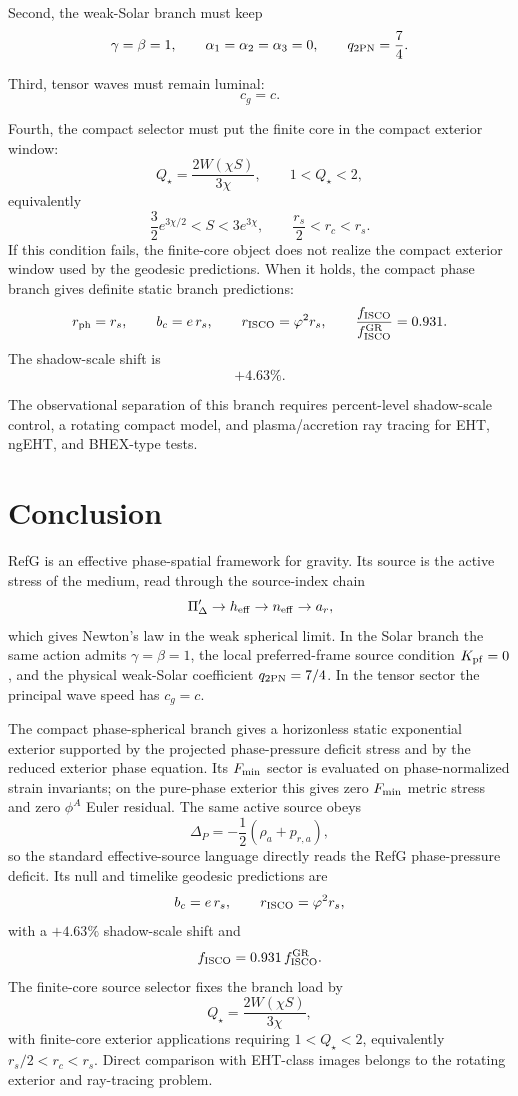\documentclass[12pt,a4paper]{article}
\begin{document}
Second, the weak-Solar branch must keep
\[
\gamma=\beta=1,\qquad
\alpha_1=\alpha_2=\alpha_3=0,
\qquad
q_{2{\rm PN}}=\frac74.
\]

Third, tensor waves must remain luminal:
\[
c_g=c.
\]

Fourth, the compact selector must put the finite core in the compact exterior
window:
\[
Q_\star=\frac{2W(\chi S)}{3\chi},\qquad
1<Q_\star<2,
\]
equivalently
\[
\frac32 e^{3\chi/2}<S<3e^{3\chi},\qquad
\frac{r_s}{2}<r_c<r_s.
\]
If this condition fails, the finite-core object does not realize the compact
exterior window used by the geodesic predictions. When it holds, the compact
phase branch gives definite static branch predictions:
\[
r_{\rm ph}=r_s,\qquad
b_c=e\,r_s,\qquad
r_{\rm ISCO}=\varphi^2r_s,\qquad
\frac{f_{\rm ISCO}}{f_{\rm ISCO}^{\rm GR}}=0.931.
\]
The shadow-scale shift is
\[
+4.63\%.
\]

The observational separation of this branch requires percent-level shadow-scale control, a rotating compact model, and plasma/accretion ray tracing for EHT, ngEHT, and BHEX-type tests.

\section{Conclusion}

RefG is an effective phase-spatial framework for gravity. Its source is the active stress of the medium, read through the source-index chain
\[
\Pi_\Delta'\rightarrow h_{\rm eff}\rightarrow n_{\rm eff}\rightarrow a_r,
\]
which gives Newton's law in the weak spherical limit. In the Solar branch the same action admits $\gamma=\beta=1$, the local preferred-frame source condition $K_{\rm pf}=0$, and the physical weak-Solar coefficient $q_{2{\rm PN}}=7/4$. In the tensor sector the principal wave speed has $c_g=c$.

The compact phase-spherical branch gives a horizonless static exponential exterior supported by the projected phase-pressure deficit stress and by the reduced exterior phase equation. Its $F_{\rm min}$ sector is evaluated on phase-normalized strain invariants; on the pure-phase exterior this gives zero $F_{\rm min}$ metric stress and zero $\phi^A$ Euler residual. The same active source obeys
\[
\Delta_P=-\frac{1}{2}\left(\rho_a+p_{r,a}\right),
\]
so the standard effective-source language directly reads the RefG
phase-pressure deficit. Its null and timelike geodesic predictions are
\[
b_c=e\,r_s,\qquad
r_{\rm ISCO}=\varphi^2r_s,
\]
with a $+4.63\%$ shadow-scale shift and
\[
f_{\rm ISCO}=0.931\,f_{\rm ISCO}^{\rm GR}.
\]
The finite-core source selector fixes the branch load by
\[
Q_\star=\frac{2W(\chi S)}{3\chi},
\]
with finite-core exterior applications requiring
$1<Q_\star<2$, equivalently $r_s/2<r_c<r_s$. Direct comparison with
EHT-class images belongs to the rotating exterior and ray-tracing problem.
\end{document}
